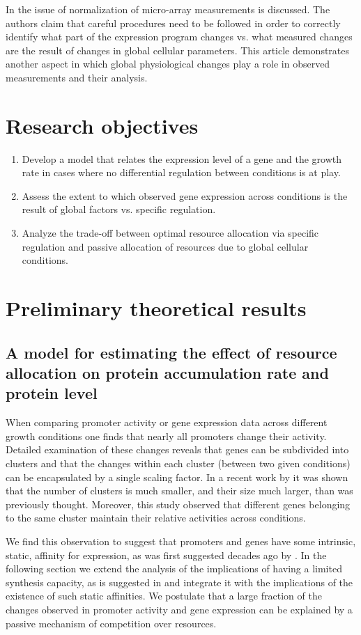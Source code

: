 \documentclass[a4page,notitlepage]{article}
\begin{document}
In \parencite{loven2012} the issue of normalization of micro-array measurements is discussed.
The authors claim that careful procedures need to be followed in order to correctly identify what part of the expression program changes vs. what measured changes are the result of changes in global cellular parameters.
This article demonstrates another aspect in which global physiological changes play a role in observed measurements and their analysis.

\section{Research objectives}
\begin{enumerate}
\item Develop a model that relates the expression level of a gene and the growth rate in cases where no differential regulation between conditions is at play.
\item Assess the extent to which observed gene expression across conditions is the result of global factors vs. specific regulation.
\item Analyze the trade-off between optimal resource allocation via specific regulation and passive allocation of resources due to global cellular conditions.
\end{enumerate}
\section{Preliminary theoretical results}
\subsection{A model for estimating the effect of resource allocation on protein accumulation rate and protein level}
When comparing promoter activity or gene expression data across different growth conditions one finds that nearly all promoters change their activity.
Detailed examination of these changes reveals that genes can be subdivided into clusters and that the changes within each cluster (between two given conditions) can be encapsulated by a single scaling factor.
In a recent work by \parencite{Leeat2013} it was shown that the number of clusters is much smaller, and their size much larger, than was previously thought.
Moreover, this study observed that different genes belonging to the same cluster maintain their relative activities across conditions.

We find this observation to suggest that promoters and genes have some intrinsic, static, affinity for expression, as was first suggested decades ago by \parencite{Maaloe1969}.
In the following section we extend the analysis of the implications of having a limited synthesis capacity, as is suggested in \parencite{Leeat2013} and integrate it with the implications of the existence of such static affinities.
We postulate that a large fraction of the changes observed in promoter activity and gene expression can be explained by a passive mechanism of competition over resources.
\end{document}

